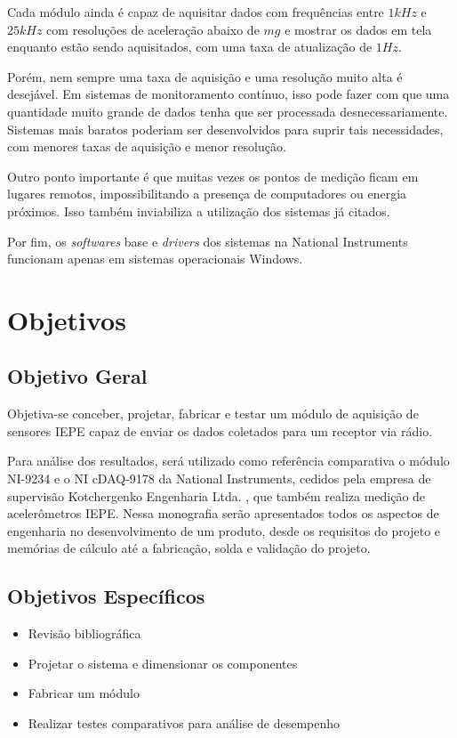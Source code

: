 \documentclass[
	12pt,				%
	openright,			%
	twoside,			%
	a4paper,			%
	english,			%
	french,				%
	spanish,			%
	brazil,				%
	]{abntex2}
\begin{document}
		Cada módulo ainda é capaz de aquisitar dados com frequências entre $1kHz$ e $25kHz$ com resoluções de aceleração abaixo de $mg$ e mostrar os dados em tela enquanto estão sendo aquisitados, com uma taxa de atualização de $1Hz$.

		Porém, nem sempre uma taxa de aquisição e uma resolução muito alta é desejável. Em sistemas de monitoramento contínuo, isso pode fazer com que uma quantidade muito grande de dados tenha que ser processada desnecessariamente. Sistemas mais baratos poderiam ser desenvolvidos para suprir tais necessidades, com menores taxas de aquisição e menor resolução.

		Outro ponto importante é que muitas vezes os pontos de medição ficam em lugares remotos, impossibilitando a presença de computadores ou energia próximos. Isso também inviabiliza a utilização dos sistemas já citados.

		Por fim, os \textit{softwares} base e \textit{drivers} dos sistemas na National Instruments funcionam apenas em sistemas operacionais Windows.
	\section{Objetivos}

		\subsection{Objetivo Geral}
			Objetiva-se conceber, projetar, fabricar e testar um módulo de aquisição de sensores IEPE capaz de enviar os dados coletados para um receptor via rádio.

			Para análise dos resultados, será utilizado como referência comparativa o módulo NI-9234 e o NI cDAQ-9178 da National Instruments, cedidos pela empresa de supervisão Kotchergenko Engenharia Ltda. \cite{kot}, que também realiza medição de acelerômetros IEPE. Nessa monografia serão apresentados todos os aspectos de engenharia no desenvolvimento de um produto, desde os requisitos do projeto e memórias de cálculo até a fabricação, solda e validação do projeto.

		\subsection{Objetivos Específicos}
			\begin{itemize}
				\item Revisão bibliográfica
				\item Projetar o sistema e dimensionar os componentes
				\item Fabricar um módulo
				\item Realizar testes comparativos para análise de desempenho
			\end{itemize}
\end{document}
